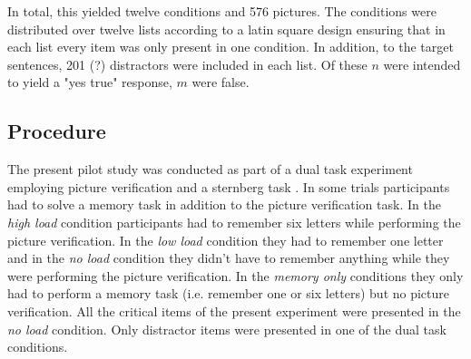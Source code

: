 \documentclass[fleqn,reqno,10pt,draft]{article}
\begin{document}
In total, this yielded twelve conditions and 576 pictures. The conditions were distributed over twelve lists according to a latin square design ensuring that in each list every item was only present in one condition. In addition, to the target sentences, 201 (?) distractors were included in each list. Of these $n$ were intended to yield a "yes true" response, $m$ were false.

% 
%
%

\subsection{Procedure}
The present pilot study was conducted as part of a dual task experiment employing picture verification and a sternberg task \cite{Sternberg1966}.  In some trials participants had to solve a memory task in addition to the picture verification task. In the {\it high load} condition participants had to remember six letters while performing the picture verification. In the {\it low load} condition they had to remember one letter and in the {\it no load} condition they didn't have to remember anything while they were performing the picture verification. In the {\it memory only} conditions they only had to perform a memory task (i.e. remember one or six letters) but no picture verification. All the critical items of the present experiment were presented in the {\it no load} condition. Only distractor items were presented in one of the dual task conditions.  
\end{document}
